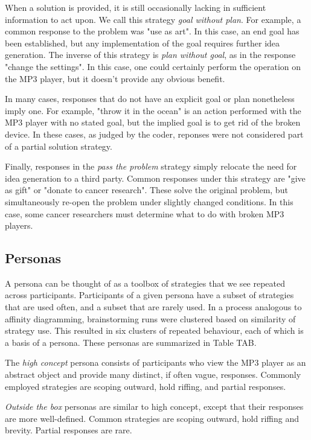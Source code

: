 When a solution is provided, it is still occasionally lacking in sufficient information to act upon. We call this strategy \emph{goal without plan}. For example, a common response to the problem was "use as art". In this case, an end goal has been established, but any implementation of the goal requires further idea generation. The inverse of this strategy is \emph{plan without goal}, as in the response "change the settings". In this case, one could certainly perform the operation on the MP3 player, but it doesn't provide any obvious benefit.

In many cases, responses that do not have an explicit goal or plan nonetheless imply one. For example, "throw it in the ocean" is an action performed with the MP3 player with no stated goal, but the implied goal is to get rid of the broken device. In these cases, as judged by the coder, reponses were not considered part of a partial solution strategy.

Finally, responses in the \emph{pass the problem} strategy simply relocate the need for idea generation to a third party. Common responses under this strategy are "give as gift" or "donate to cancer research". These solve the original problem, but simultaneously re-open the problem under slightly changed conditions. In this case, some cancer researchers must determine what to do with broken MP3 players.

\subsection{Personas}

A persona can be thought of as a toolbox of strategies that we see repeated across participants. Participants of a given persona have a subset of strategies that are used often, and a subset that are rarely used. In a process analogous to affinity diagramming, brainstorming runs were clustered based on similarity of strategy use. This resulted in six clusters of repeated behaviour, each of which is a basis of a persona. These personas are summarized in Table TAB.

The \emph{high concept} persona consists of participants who view the MP3 player as an abstract object and provide many distinct, if often vague, responses. Commonly employed strategies are scoping outward, hold riffing, and partial responses.

\emph{Outside the box} personas are similar to high concept, except that their responses are more well-defined. Common strategies are scoping outward, hold riffing and brevity. Partial responses are rare.

